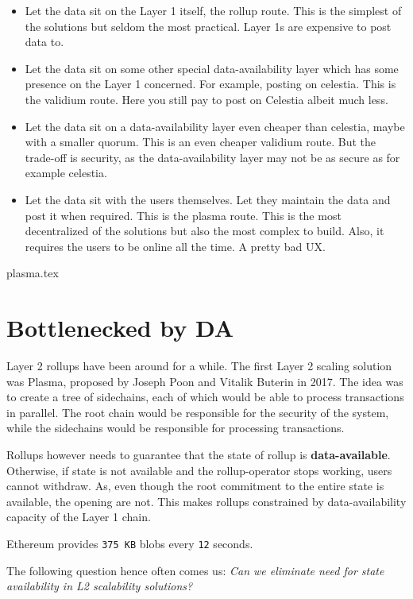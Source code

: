 \begin{itemize}
    \item Let the data sit on the Layer 1 itself, the rollup route. This is the simplest of the solutions but seldom the most practical. Layer 1s are expensive to post data to.
    \item Let the data sit on some other special data-availability layer which has some presence on the Layer 1 concerned. For example, posting on celestia. This is the validium route. Here you still pay to post on Celestia albeit much less.
    \item Let the data sit on a data-availability layer even cheaper than celestia, maybe with a smaller quorum. This is an even cheaper validium route. But the trade-off is security, as the data-availability layer may not be as secure as for example celestia.
    \item Let the data sit with the users themselves. Let they maintain the data and post it when required. This is the plasma route. This is the most decentralized of the solutions but also the most complex to build. Also, it requires the users to be online all the time. A pretty bad UX.
\end{itemize}

{plasma.tex}

\section{Bottlenecked by DA}
Layer 2 rollups have been around for a while. The first Layer 2 scaling solution was Plasma, proposed by Joseph Poon and Vitalik Buterin in 2017. The idea was to create a tree of sidechains, each of which would be able to process transactions in parallel. The root chain would be responsible for the security of the system, while the sidechains would be responsible for processing transactions.

Rollups however needs to guarantee that the state of rollup is \textbf{data-available}. Otherwise, if state is not available and the rollup-operator stops working, users cannot withdraw. As, even though the root commitment to the entire state is available, the opening are not. This makes rollups constrained by data-availability capacity of the Layer 1 chain.

Ethereum provides \texttt{375 KB} blobs every \texttt{12} seconds.

The following question hence often comes us: \emph{Can we eliminate need for state availability in L2 scalability solutions?}

